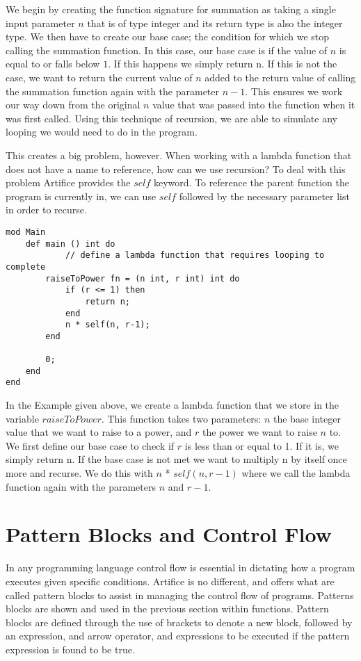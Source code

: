 \documentclass{article}
\begin{document}
We begin by creating the function signature for summation as taking a single input parameter $n$ that is of type integer and its return type is also the integer type.
We then have to create our base case; the condition for which we stop calling the summation function. In this case, our base case is if the value of $n$ is equal to
or falls below $1$. If this happens we simply return n. If this is not the case, we want to return the current value of $n$ added to the return value of calling the
summation function again with the parameter $n-1$. This ensures we work our way down from the original $n$ value that was passed into the function when it was first
called. Using this technique of recursion, we are able to simulate any looping we would need to do in the program.

This creates a big problem, however. When working with a lambda function that does not have a name to reference, how can we use recursion? To deal with this problem
Artifice provides the $self$ keyword. To reference the parent function the program is currently in, we can use $self$ followed by the necessary parameter list in order
to recurse.

\begin{lstlisting}
mod Main
	def main () int do
			// define a lambda function that requires looping to complete
		raiseToPower fn = (n int, r int) int do
			if (r <= 1) then
				return n;
			end
			n * self(n, r-1);
		end

		0;
	end
end
\end{lstlisting}

In the Example given above, we create a lambda function that we store in the variable $raiseToPower$. This function takes two parameters: $n$ the base integer value
that we want to raise to a power, and $r$ the power we want to raise $n$ to. We first define our base case to check if $r$ is less than or equal to 1. If it is,
we simply return n. If the base case is not met we want to multiply n by itself once more and recurse. We do this with $n$ * $self(n,r-1)$ where we call the
lambda function again with the parameters $n$ and $r-1$.


\section{Pattern Blocks and Control Flow}

In any programming language control flow is essential in dictating how a program executes given specific conditions. Artifice is no different, and offers what are called
pattern blocks to assist in managing the control flow of programs. Patterns blocks are shown and used in the previous section within functions. Pattern blocks are defined
through the use of brackets to denote a new block, followed by an expression, and arrow operator, and expressions to be executed if the pattern expression is found to be true.
\end{document}
